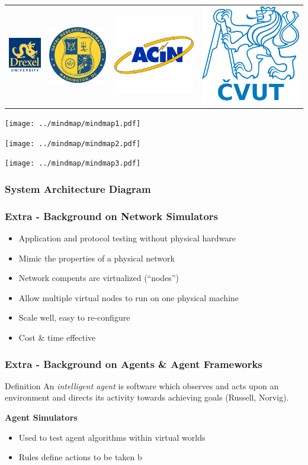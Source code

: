 \documentclass[mathserif,usenames,dvipsnames]{beamer}
\newcommand{\backupbegin}{
       \newcounter{framenumberappendix}
          \setcounter{framenumberappendix}{\value{framenumber}}
}
\begin{document}
{\begin{center}
\begin{tabular}{c c c c}
    \includegraphics[scale=.28]{../common/drexel.pdf} & \includegraphics[scale=.33]{../common/nrl.png} & \includegraphics[scale=.125]{../common/acin.pdf} & \includegraphics[scale=.125]{../common/cvut.png} \\
    \end{tabular}
    \end{center}

}

\backupbegin

\frame
{
    \begin{center}
        \texttt{[image: ../mindmap/mindmap1.pdf]}
    \end{center}
}

\frame
{
    \begin{center}
        \texttt{[image: ../mindmap/mindmap2.pdf]}
    \end{center}
}

\frame
{
    \begin{center}
        \texttt{[image: ../mindmap/mindmap3.pdf]}
    \end{center}
}

\frame
{
    \frametitle{System Architecture Diagram}
    \begin{center}
    \begin{figure}
        \resizebox{0.8\textwidth}{!}{}
    \end{figure}
    \end{center}
}

\frame
{
    \frametitle{Extra - Background on Network Simulators}
    \begin{itemize}
        \item Application and protocol testing without physical hardware
        \item Mimic the properties of a physical network
        \item Network compents are virtualized (``nodes'') 
        \item Allow multiple virtual nodes to run on one physical machine
        \item Scale well, easy to re-configure
        \item Cost \& time effective
    \end{itemize}
}

\frame
{
    \frametitle{Extra - Background on Agents \& Agent Frameworks}
    \begin{block}{Definition}
    An \emph{intelligent agent} is software which observes and acts upon an environment and directs its activity towards achieving goals (Russell, Norvig).
    \end{block}

    \textbf{Agent Simulators}
    \begin{itemize}
        \item Used to test agent algorithms within virtual worlds
        \item Rules define actions to be taken b
\end{itemize}}
\end{document}
